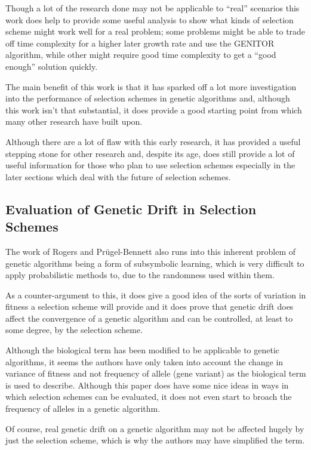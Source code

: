\documentclass[10pt, a4paper]{article}
\begin{document}
Though a lot of the research done may not be applicable to ``real'' scenarios
this work does help to provide some useful analysis to show what kinds of
selection scheme might work well for a real problem; some problems might be able
to trade off time complexity for a higher later growth rate and use the GENITOR
algorithm, while other might require good time complexity to get a ``good
enough'' solution quickly.

The main benefit of this work is that it has sparked off a lot more
investigation into the performance of selection schemes in genetic algorithms
and, although this work isn't that substantial, it does provide a good starting
point from which many other research have built upon.

Although there are a lot of flaw with this early research, it has provided a
useful stepping stone for other research and, despite its age, does still
provide a lot of useful information for those who plan to use selection schemes
especially in the later sections which deal with the future of selection
schemes.


\subsection{Evaluation of Genetic Drift in Selection Schemes} 
The work of Rogers and Pr\"{u}gel-Bennett\cite{Rogers1999Genetic} also runs 
into this inherent problem of genetic algorithms being a form of subsymbolic 
learning, which is very difficult to apply probabilistic methods to, due to the
randomness used within them.

As a counter-argument to this, it does give a good idea of the sorts of
variation in fitness a selection scheme will provide and it does prove that
genetic drift does affect the convergence of a genetic algorithm and can be
controlled, at least to some degree, by the selection scheme.

Although the biological term has been modified to be applicable to genetic
algorithms, it seems the authors have only taken into account the change in
variance of fitness and not frequency of allele (gene variant) as the 
biological term is used to describe. Although this paper does have some nice
ideas in ways in which selection schemes can be evaluated, it does not even
start to broach the frequency of alleles in a genetic algorithm.

Of course, real genetic drift on a genetic algorithm may not be affected hugely
by just the selection scheme, which is why the authors may have simplified the
term.
\end{document}
